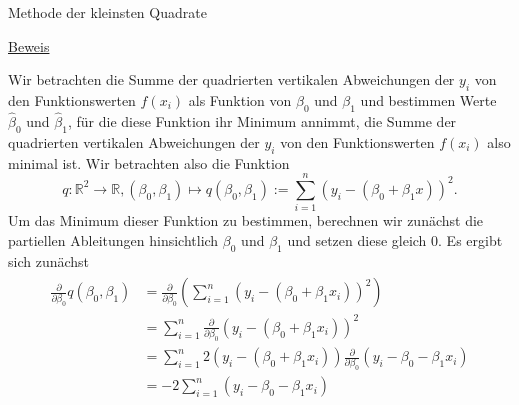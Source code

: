 \documentclass[
  8pt,
  ignorenonframetext,
]{beamer}
\begin{document}
\begin{frame}{Methode der kleinsten Quadrate}
\protect\hypertarget{methode-der-kleinsten-quadrate-7}{}
\tiny
\setlength{\abovedisplayskip}{3pt}
\setlength{\belowdisplayskip}{3pt}

\underline{Beweis}

Wir betrachten die Summe der quadrierten vertikalen Abweichungen der
\(y_i\) von den Funktionswerten \(f(x_i)\) als Funktion von \(\beta_0\)
und \(\beta_1\) und bestimmen Werte \(\hat{\beta}_0\) und
\(\hat{\beta}_1\), für die diese Funktion ihr Minimum annimmt, die Summe
der quadrierten vertikalen Abweichungen der \(y_i\) von den
Funktionswerten \(f(x_i)\) also minimal ist. Wir betrachten also die
Funktion \begin{equation}
q : \mathbb{R}^2 \to \mathbb{R}, (\beta_0,\beta_1) \mapsto q(\beta_0,\beta_1)
:= \sum_{i=1}^n \left(y_i - (\beta_0 + \beta_1 x)\right)^2.
\end{equation} Um das Minimum dieser Funktion zu bestimmen, berechnen
wir zunächst die partiellen Ableitungen hinsichtlich \(\beta_0\) und
\(\beta_1\) und setzen diese gleich 0. Es ergibt sich zunächst
\begin{align}
\begin{split}
\frac{\partial}{\partial \beta_0} q(\beta_0,\beta_1)
& = \frac{\partial}{\partial \beta_0}\left(\sum_{i=1}^n \left(y_i - (\beta_0 + \beta_1 x_i)\right)^2\right) \\[-5pt]
& = \sum_{i=1}^n \frac{\partial}{\partial \beta_0} \left(y_i - (\beta_0 + \beta_1 x_i)\right)^2 \\[-5pt]
& = \sum_{i=1}^n 2\left(y_i - (\beta_0 + \beta_1 x_i)\right)\frac{\partial}{\partial \beta_0}\left(y_i - \beta_0 - \beta_1 x_i \right)  \\[-5pt]
&  = -2\sum_{i=1}^n \left(y_i - \beta_0  - \beta_1 x_i\right)
\end{split}
\end{align}
\end{frame}
\end{document}
